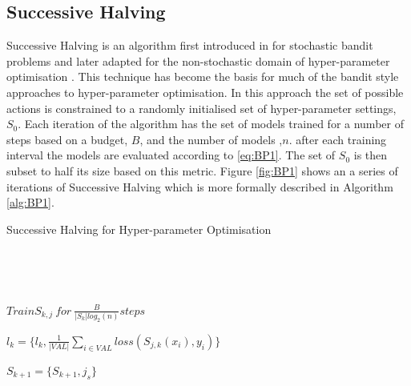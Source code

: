 	\subsection{Successive Halving}

	Successive Halving is an algorithm first introduced in \cite{SH0} for stochastic bandit problems and later adapted for the non-stochastic domain of hyper-parameter optimisation \cite{SH}. This technique has become the basis for much of the bandit style approaches to hyper-parameter optimisation. In this approach the set of possible actions is constrained to a randomly initialised set of hyper-parameter settings, \(S_0\).
	Each iteration of the algorithm has the set of models trained for a number of steps based on a budget, \(B\), and the number of models ,\(n\). after each training interval the models are evaluated according to \ref{eq:BP1}. The set of \(S_0\) is then subset to half its size based on this metric. Figure \ref{fig:BP1} shows an a series of iterations of Successive Halving which is more formally described in Algorithm \ref{alg:BP1}.


	\par
	

		\begin{algorithm}[H]\label{alg:BP1}
			\caption{Successive Halving for Hyper-parameter Optimisation}

			\SetAlgoLined
			\
			
			
			\

				{

					{
					\(Train S_{k,j} ~for~ \frac{B}{|S_k|log_2(n)} steps\)\;

					\(l_{k} = \{l_k,\frac{1}{|VAL|} \sum_{i \in VAL} loss(S_{j,k}(x_i),y_i)\}\) \;
					

					}


					{
						{

						\(S_{k+1} = \{S_{k+1},j_s\}\)\;

						}

			
			  		}
			
				}		
		\end{algorithm}



